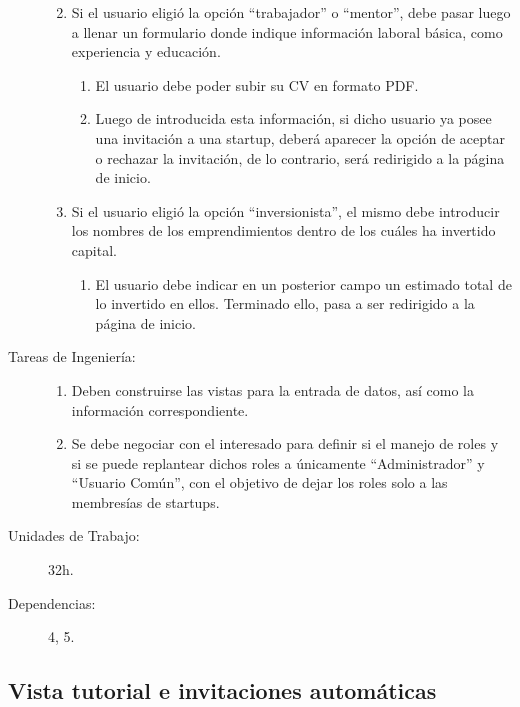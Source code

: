 \begin{description}
\begin{enumerate}
\begin{enumerate}
            \end{enumerate}
            \item Si el usuario eligió la opción “trabajador” o “mentor”, debe pasar luego a llenar un formulario donde indique información laboral básica, como experiencia y educación.
                \begin{enumerate}
                    \item El usuario debe poder subir su CV en formato PDF.
                    \item Luego de introducida esta información, si dicho usuario ya posee una invitación a una startup, deberá aparecer la opción de aceptar o rechazar la invitación, de lo contrario, será redirigido a la página de inicio.
                \end{enumerate}
            \item Si el usuario eligió la opción “inversionista”, el mismo debe introducir los nombres de los emprendimientos dentro de los cuáles ha invertido capital.
                \begin{enumerate}
                    \item El usuario debe indicar en un posterior campo un estimado total de lo invertido en ellos. Terminado ello, pasa a ser redirigido a la página de inicio.
                \end{enumerate}
        \end{enumerate}
    \item[Tareas de Ingeniería:] \hfill
        \begin{enumerate}
            \item Deben construirse las vistas para la entrada de datos, así como la información correspondiente.
            \item Se debe negociar con el interesado para definir si el manejo de roles y si se puede replantear dichos roles a únicamente “Administrador” y “Usuario Común”, con el objetivo de dejar los roles solo a las membresías de startups.
        \end{enumerate}
    \item[Unidades de Trabajo:] 32h.
    \item[Dependencias:] 4, 5.
\end{description}

\newpage    

\subsection{Vista tutorial e invitaciones automáticas}

